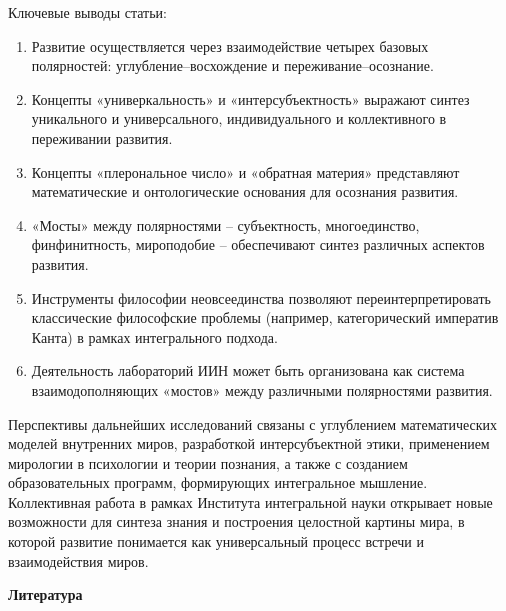     Ключевые выводы статьи:
    \begin{enumerate}
        \item Развитие осуществляется через взаимодействие четырех базовых полярностей: углубление–восхождение и переживание–осознание.
        \item Концепты «универкальность» и «интерсубъектность» выражают синтез уникального и универсального, индивидуального и коллективного в переживании развития.
        \item Концепты «плерональное число» и «обратная материя» представляют математические и онтологические основания для осознания развития.
        \item «Мосты» между полярностями – субъектность, многоединство, финфинитность, мироподобие – обеспечивают синтез различных аспектов развития.
        \item Инструменты философии неовсеединства позволяют переинтерпретировать классические философские проблемы (например, категорический императив Канта) в рамках интегрального подхода.
        \item Деятельность лабораторий ИИН может быть организована как система взаимодополняющих «мостов» между различными полярностями развития.
    \end{enumerate}

    Перспективы дальнейших исследований связаны с углублением математических моделей внутренних миров, разработкой интерсубъектной этики, применением мирологии в психологии и теории познания, а также с созданием образовательных программ, формирующих интегральное мышление. Коллективная работа в рамках Института интегральной науки открывает новые возможности для синтеза знания и построения целостной картины мира, в которой развитие понимается как универсальный процесс встречи и взаимодействия миров.

    \begin{center}
        \textbf{Литература}
    \end{center}

